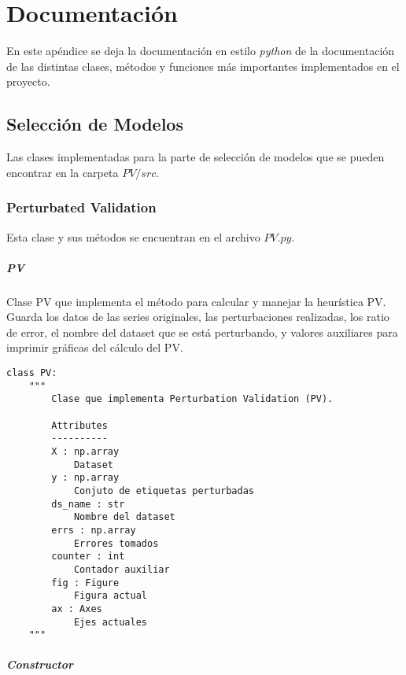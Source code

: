 
\chapter{Documentación}\label{ap:documentacion}

En este apéndice se deja la documentación en estilo \emph{python} de la documentación de las distintas clases, métodos y funciones más importantes implementados en el proyecto.

\section{Selección de Modelos}

Las clases implementadas para la parte de selección de modelos que se pueden encontrar en la carpeta $PV/src$.

\subsection{Perturbated Validation}

Esta clase y sus métodos se encuentran en el archivo $PV.py$.

\paragraph{PV}

Clase PV que implementa el método para calcular y manejar la heurística PV. Guarda los datos de las series originales, las perturbaciones realizadas, los ratio de error, el nombre del dataset que se está perturbando, y valores auxiliares para imprimir gráficas del cálculo del PV.

\begin{lstlisting}
class PV:
    """
        Clase que implementa Perturbation Validation (PV).

        Attributes
        ----------
        X : np.array
            Dataset
        y : np.array
            Conjuto de etiquetas perturbadas
        ds_name : str
            Nombre del dataset
        errs : np.array
            Errores tomados
        counter : int
            Contador auxiliar
        fig : Figure
            Figura actual
        ax : Axes
            Ejes actuales
    """
\end{lstlisting}

\paragraph{Constructor}

